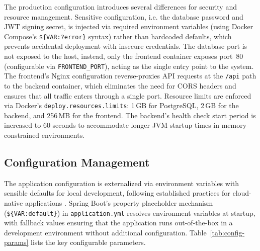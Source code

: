  \par The production configuration introduces several differences for security and resource management. Sensitive configuration, i.e. the database password and JWT signing secret, is injected via required environment variables (using Docker Compose's \texttt{\$\{VAR:?error\}} syntax) rather than hardcoded defaults, which prevents accidental deployment with insecure credentials. The database port is not exposed to the host, instead, only the frontend container exposes port~80 (configurable via \texttt{FRONTEND\_PORT}), acting as the single entry point to the system. The frontend's Nginx configuration reverse-proxies API requests at the \texttt{/api} path to the backend container, which eliminates the need for CORS headers and ensures that all traffic enters through a single port. Resource limits are enforced via Docker's \texttt{deploy\-.resources\-.limits}: 1\,GB for PostgreSQL, 2\,GB for the backend, and 256\,MB for the frontend. The backend's health check start period is increased to 60 seconds to accommodate longer JVM startup times in memory-constrained environments.

\subsection{Configuration Management}
\label{subsec:config-management}

 \par The application configuration is externalized via environment variables with sensible defaults for local development, following established practices for cloud-native applications \cite{Newman2015}. Spring Boot's property placeholder mechanism (\texttt{\$\{VAR:default\}}) in \texttt{application.yml} resolves environment variables at startup, with fallback values ensuring that the application runs out-of-the-box in a development environment without additional configuration. Table~\ref{tab:config-params} lists the key configurable parameters.


